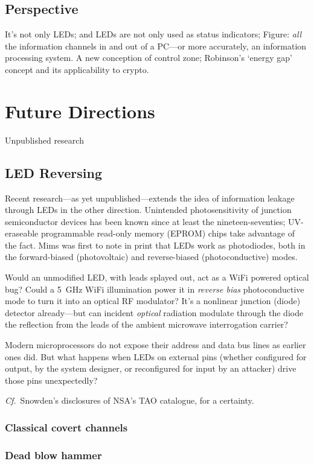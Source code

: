 \documentclass[a4paper,twoside]{book}
\begin{document}
\subsection{Perspective}
It's not only LEDs; and LEDs are not only used as status indicators; Figure:
\emph{all} the information channels in and out of a PC---or more accurately,
an information processing system. A new conception of control zone;
Robinson's `energy gap' concept and its applicability to crypto.
\section{Future Directions}
Unpublished research
\subsection{LED Reversing}
Recent research---as yet unpublished---extends the idea of information leakage
through LEDs in the other direction. Unintended photosensitivity of junction
semiconductor devices has been known since at least the nineteen-seventies;
UV-eraseable programmable read-only memory (EPROM) chips take advantage of the
fact. Mims \citeyear{Mims1973b} was first to note in print that LEDs work as
photodiodes, both in the forward-biased (photovoltaic) and reverse-biased
(photoconductive) modes.

Would an unmodified LED, with leads splayed out, act as a WiFi powered
optical bug? Could a \SI{5}{\giga\hertz} WiFi illumination power it in
\emph{reverse bias} photoconductive mode to turn it into an optical RF
modulator? It's a nonlinear junction (diode) detector already---but can
incident \emph{optical} radiation modulate through the diode the reflection
from the leads of the ambient microwave interrogation carrier?

Modern microprocessors do not expose their address and data bus lines as
earlier ones did. But what happens when LEDs on external pins (whether
configured for output, by the system designer, or reconfigured for input by an
attacker) drive those pins unexpectedly?

{\it Cf.}\ Snowden's disclosures of NSA's TAO catalogue, for a certainty.
\subsubsection{Classical covert channels}
\subsubsection{Dead blow hammer}


\end{document}
